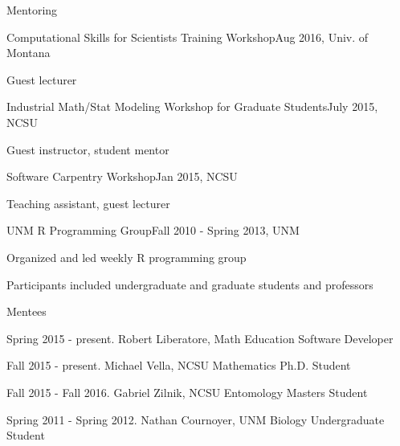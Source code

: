 \documentclass{resume} %
\begin{document}
\begin{rSection}{Mentoring}
\begin{rSubsection}{Computational Skills for Scientists Training Workshop}{Aug 2016, Univ. of Montana}{}{}
\item Guest lecturer
\end{rSubsection}
\begin{rSubsection}{Industrial Math/Stat Modeling Workshop for Graduate Students}{July 2015, NCSU}{}{}
\item Guest instructor, student mentor
\end{rSubsection}
\begin{rSubsection}{Software Carpentry Workshop}{Jan 2015, NCSU}{}{}
\item Teaching assistant, guest lecturer
\end{rSubsection}
\begin{rSubsection}{UNM R Programming Group}{Fall 2010 - Spring 2013, UNM}{}{}
\item Organized and led weekly R programming group
\item Participants included undergraduate and graduate students and professors
\end{rSubsection}
\begin{rSubsection}{Mentees}{}{}{}
\item Spring 2015 - present. Robert Liberatore, Math Education Software Developer
\item Fall 2015 - present. Michael Vella, NCSU Mathematics Ph.D. Student
\item Fall 2015 - Fall 2016. Gabriel Zilnik, NCSU Entomology Masters Student
\item Spring 2011 - Spring 2012. Nathan Cournoyer, UNM Biology Undergraduate Student
\end{rSubsection}
\end{rSection}

\end{document}
